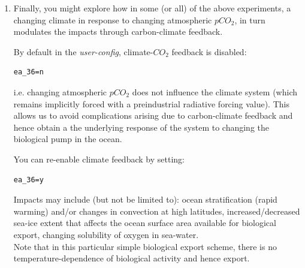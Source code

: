 \begin{enumerate}[noitemsep]
\vspace{1mm}
To collapse the \textbf{AMOC} in the modern continental configuration of \textbf{cookie}, set:

\vspace{-1mm}\small\begin{verbatim}
ea_28=0.0
\end{verbatim}\normalsize\vspace{-1mm}

Stuff to look for -- in addition to how the AMOC changes (e.g. plot the stream-function) how do the patterns of \([PO_{4}\)] and \([O_{2}\)], particularly in the deep North Atlantic change? What impact does this have on global export production, and ultimately on atmospheric \(pCO_{2}\)?

\vspace{1mm}
Before you look at the results -- try and guess/reason whether atmospheric $pCO{_2}$ will go up or down? If you killed the AMOC in Chapter 6 -- with just the $CO{_2}$ pump operating (the abiotic carbon cycle configuration) -- did $pCO{_2}$  go up or down then?

\vspace{1mm}
\item Finally, you might explore how in some (or all) of the above experiments, a changing climate in response to changing atmospheric \(pCO_{2}\), in turn modulates the impacts through carbon-climate feedback. 

\vspace{1mm}
By default in the \textit{user-config}, climate-\(CO_{2}\) feedback is disabled:
\vspace{-1pt}\small\begin{verbatim}
ea_36=n
\end{verbatim}\normalsize\vspace{-1pt}
i.e. changing atmospheric \(pCO_{2}\) does not influence the climate system (which remains implicitly forced with a preindustrial radiative forcing value). This allows us to avoid complications arising due to carbon-climate feedback and hence obtain a the underlying response of the system to changing the biological pump in the ocean.

\vspace{1mm}
You can re-enable climate feedback by setting:
\vspace{-1mm}\small\begin{verbatim}
ea_36=y
\end{verbatim}\normalsize\vspace{-1mm}
Impacts may include (but not be limited to): ocean stratification (rapid warming) and/or changes in convection at high latitudes, increased/decreased sea-ice extent that affects the ocean surface area available for biological export, changing solubility of oxygen in sea-water.
\\Note that in this particular simple biological export scheme, there is no temperature-dependence of biological activity and hence export.

\end{enumerate}

